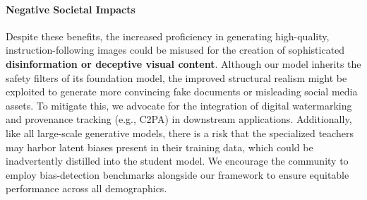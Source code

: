 \paragraph{Negative Societal Impacts}
Despite these benefits, the increased proficiency in generating high-quality, instruction-following images could be misused for the creation of sophisticated \textbf{disinformation or deceptive visual content}. Although our model inherits the safety filters of its foundation model, the improved structural realism might be exploited to generate more convincing fake documents or misleading social media assets. To mitigate this, we advocate for the integration of digital watermarking and provenance tracking (e.g., C2PA) in downstream applications. Additionally, like all large-scale generative models, there is a risk that the specialized teachers may harbor latent biases present in their training data, which could be inadvertently distilled into the student model. We encourage the community to employ bias-detection benchmarks alongside our framework to ensure equitable performance across all demographics.